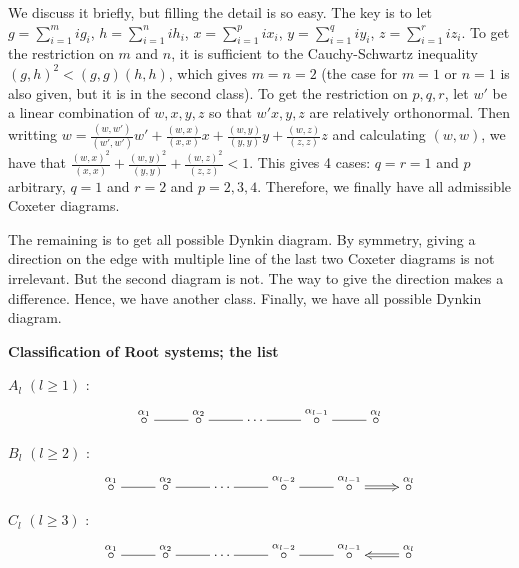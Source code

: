 \documentclass{article}
\begin{document}
We discuss it briefly, but filling the detail is so easy.
The key is to let $g = \sum_{i = 1}^m ig_i$, $h = \sum_{i = 1}^n ih_i$, $x = \sum_{i = 1}^p ix_i$, $y = \sum_{i = 1}^q iy_i$, $z = \sum_{i = 1}^r iz_i$.
To get the restriction on $m$ and $n$, it is sufficient to the Cauchy-Schwartz inequality $(g, h)^2 < (g, g) (h, h)$, which gives $m = n = 2$ (the case for $m = 1$ or $n = 1$ is also given, but it is in the second class).
To get the restriction on $p, q, r$, let $w'$ be a linear combination of $w, x, y, z$ so that $w' x, y, z$ are relatively orthonormal.
Then writting $w = \frac{(w, w')}{(w', w')}w' + \frac{(w, x)}{(x, x)}x + \frac{(w, y)}{(y, y)}y + \frac{(w, z)}{(z, z)}z$ and calculating $(w, w)$, we have that $\frac{(w, x)^2}{(x, x)} + \frac{(w, y)^2}{(y, y)} + \frac{(w, z)^2}{(z, z)} < 1$.
This gives 4 cases: $q = r = 1$ and $p$ arbitrary, $q = 1$ and $r = 2$ and $p = 2, 3, 4$.
Therefore, we finally have all admissible Coxeter diagrams.

The remaining is to get all possible Dynkin diagram.
By symmetry, giving a direction on the edge with multiple line of the last two Coxeter diagrams is not irrelevant.
But the second diagram is not.
The way to give the direction makes a difference.
Hence, we have another class.
Finally, we have all possible Dynkin diagram.

\newpage

\textbf{Classification of Root systems; the list}

$A_l$ $(l \ge 1)$ : 
\begin{displaymath}
  \xymatrix{\overset{\alpha_1}{\circ} \ar@{-}[r] & \overset{\alpha_2}{\circ} \ar@{-}[r] & \cdots \ar@{-}[r] & \overset{\alpha_{l - 1}}{\circ} \ar@{-}[r] & \overset{\alpha_l}{\circ}}
\end{displaymath}

$B_l$ $(l \ge 2)$ : 
\begin{displaymath}
  \xymatrix{\overset{\alpha_1}{\circ} \ar@{-}[r] & \overset{\alpha_2}{\circ} \ar@{-}[r] & \cdots \ar@{-}[r] & \overset{\alpha_{l - 2}}{\circ} \ar@{-}[r] & \overset{\alpha_{l - 1}}{\circ} \ar@2{->}[r] & \overset{\alpha_l}{\circ}}
\end{displaymath}

$C_l$ $(l \ge 3)$ : 
\begin{displaymath}
  \xymatrix{\overset{\alpha_1}{\circ} \ar@{-}[r] & \overset{\alpha_2}{\circ} \ar@{-}[r] & \cdots \ar@{-}[r] & \overset{\alpha_{l - 2}}{\circ} \ar@{-}[r] & \overset{\alpha_{l - 1}}{\circ} \ar@2{<-}[r] & \overset{\alpha_l}{\circ}}
\end{displaymath}
\end{document}

